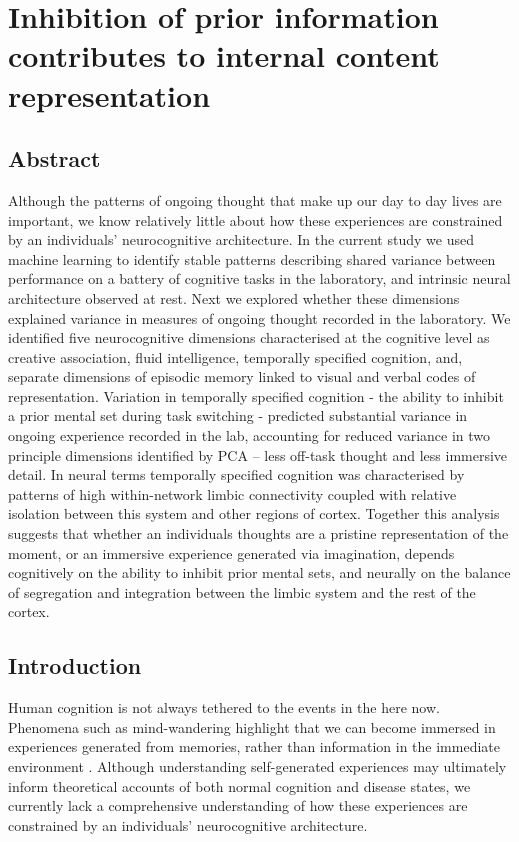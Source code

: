 \chapter{Inhibition of prior information contributes to internal content representation}
\label{ch:study3}
\section{Abstract}
Although the patterns of ongoing thought that make up our day to day lives are important, we know relatively little about how these experiences are constrained by an individuals’ neurocognitive architecture. In the current study we used machine learning to identify stable patterns describing shared variance between performance on a battery of cognitive tasks in the laboratory, and intrinsic neural architecture observed at rest. Next we explored whether these dimensions explained variance in measures of ongoing thought recorded in the laboratory. We identified five neurocognitive dimensions characterised at the cognitive level as creative association, fluid intelligence, temporally specified cognition, and, separate dimensions of episodic memory linked to visual and verbal codes of representation. Variation in temporally specified cognition - the ability to inhibit a prior mental set during task switching - predicted substantial variance in ongoing experience recorded in the lab, accounting for reduced variance in two principle dimensions identified by PCA  – less off-task thought and less immersive detail. In neural terms temporally specified cognition was characterised by patterns of high within-network limbic connectivity coupled with relative isolation between this system and other regions of cortex. Together this analysis suggests that whether an individuals thoughts are a pristine representation of the moment, or an immersive experience generated via imagination, depends cognitively on the ability to inhibit prior mental sets, and neurally on the balance of segregation and integration between the limbic system and the rest of the cortex.

\section{Introduction}
\label{study3:intro}
Human cognition is not always tethered to the events in the here now. Phenomena such as mind-wandering highlight that we can become immersed in experiences generated from memories, rather than information in the immediate environment \cite{SmallwoodSchooler2015}. Although understanding self-generated experiences may ultimately inform theoretical accounts of both normal cognition and disease states, we currently lack a comprehensive understanding of how these experiences are constrained by an individuals’ neurocognitive architecture.

